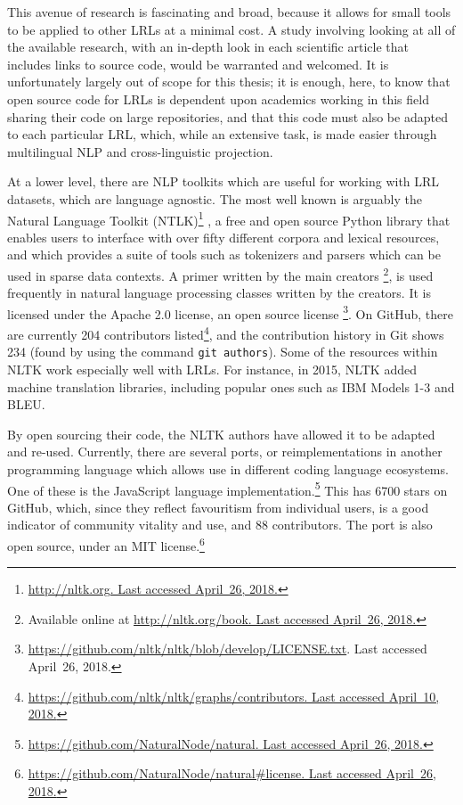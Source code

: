 This avenue of research is fascinating and broad, because it allows for small tools to be applied to other LRLs at a minimal cost. A study involving looking at all of the available research, with an in-depth look in each scientific article that includes links to source code, would be warranted and welcomed. It is unfortunately largely out of scope for this thesis; it is enough, here, to know that open source code for LRLs is dependent upon academics working in this field sharing their code on large repositories, and that this code must also be adapted to each particular LRL, which, while an extensive task, is made easier through multilingual NLP and cross-linguistic projection.

At a lower level, there are NLP toolkits which are useful for working with LRL datasets, which are language agnostic. The most well known is arguably the Natural Language Toolkit (NTLK)\footnote{\href{http://nltk.org/}{http://nltk.org. Last accessed April~26, 2018.}} \citep{bird2006nltk}, a free and open source Python library that enables users to interface with over fifty different corpora and lexical resources, and which provides a suite of tools such as tokenizers and parsers which can be used in sparse data contexts. A primer written by the main creators \citep{bird2009natural}\footnote{Available online at \href{http://nltk.org/book}{http://nltk.org/book. Last accessed April~26, 2018.}}, is used frequently in natural language processing classes written by the creators. It is licensed under the Apache 2.0 license, an open source license \footnote{\href{https://github.com/nltk/nltk/blob/develop/LICENSE.txt}{https://github.com/nltk/nltk/blob/develop/LICENSE.txt}. Last accessed April~26, 2018.}. On GitHub, there are currently 204 contributors listed\footnote{\href{https://github.com/nltk/nltk/graphs/contributors}{https://github.com/nltk/nltk/graphs/contributors. Last accessed April~10, 2018.}}, and the contribution history in Git shows 234 (found by using the command {\tt git authors}). Some of the resources within NLTK work especially well with LRLs. For instance, in 2015, NLTK added machine translation libraries, including popular ones such as IBM Models 1-3 and BLEU.

By open sourcing their code, the NLTK authors have allowed it to be adapted and re-used. Currently, there are several ports, or reimplementations in another programming language which allows use in different coding language ecosystems. One of these is the JavaScript language implementation.\footnote{\href{https://github.com/NaturalNode/natural}{https://github.com/NaturalNode/natural. Last accessed April~26, 2018.}} This has 6700 stars on GitHub, which, since they reflect favouritism from individual users, is a good indicator of community vitality and use, and 88 contributors. The port is also open source, under an MIT license.\footnote{\href{https://github.com/NaturalNode/natural\#license}{https://github.com/NaturalNode/natural\#license. Last accessed April~26, 2018.}}

